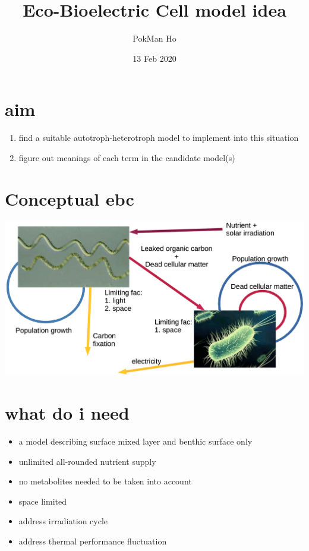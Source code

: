 \documentclass[a4paper,11pt]{article}
\title{Eco-Bioelectric Cell model idea}
\author{PokMan Ho}
\date{13 Feb 2020}
\begin{document}
    \maketitle
    \tableofcontents
    
    \section{aim}
    \begin{enumerate}
        \item find a suitable autotroph-heterotroph model to implement into this situation
        \item figure out meanings of each term in the candidate model(s)
    \end{enumerate}
    \section{Conceptual ebc}
    \includegraphics[width=\linewidth]{sandbox/graph/model_01.png}
    \section{what do i need}
    \begin{itemize}
        \item a model describing surface mixed layer and benthic surface only
        \item unlimited all-rounded nutrient supply
        \item no metabolites needed to be taken into account
        \item space limited
        \item address irradiation cycle
        \item address thermal performance fluctuation
    \end{itemize}
\end{document}
